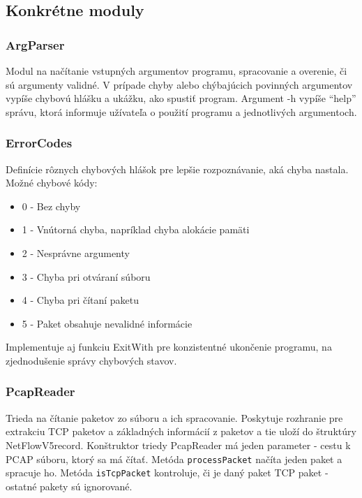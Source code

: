 \documentclass[a4paper, 12pt]{article}
\begin{document}
\subsection{Konkrétne moduly}

\subsubsection{ArgParser}
Modul na načítanie vstupných argumentov programu, spracovanie a overenie, či sú argumenty validné. V prípade chyby alebo chýbajúcich povinných argumentov vypíše chybovú hlášku a ukážku, ako spustiť program. Argument -h vypíše ``help'' správu, ktorá informuje užívateľa o použití programu a jednotlivých argumentoch.

\subsubsection{ErrorCodes}
Definície rôznych chybových hlášok pre lepšie rozpoznávanie, aká chyba nastala.
Možné chybové kódy:
\begin{itemize}
    \item 0 - Bez chyby
    \item 1 - Vnútorná chyba, napríklad chyba alokácie pamäti
    \item 2 - Nesprávne argumenty
    \item 3 - Chyba pri otváraní súboru
    \item 4 - Chyba pri čítaní paketu
    \item 5 - Paket obsahuje nevalidné informácie
\end{itemize}

Implementuje aj funkciu ExitWith pre konzistentné ukončenie programu, na zjednodušenie správy chybových stavov.

\subsubsection{PcapReader}
Trieda na čítanie paketov zo súboru a ich spracovanie. Poskytuje rozhranie pre extrakciu TCP paketov a základných informácií z paketov a tie uloží do štruktúry NetFlowV5record. Konštruktor triedy PcapReader má jeden parameter - cestu k PCAP súboru, ktorý sa má čítať. Metóda \texttt{processPacket} načíta jeden paket a spracuje ho. Metóda \texttt{isTcpPacket} kontroluje, či je daný paket TCP paket - ostatné pakety sú ignorované.
\end{document}
